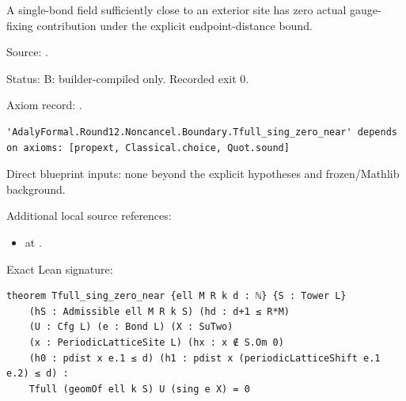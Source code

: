 \begin{theorem}[bp-204]
\label{bp-204}
\uses{}
\leanok
A single-bond field sufficiently close to an exterior site has zero actual gauge-fixing contribution under the explicit endpoint-distance bound.

\par Source: \texttt{}.
\par Status: B: builder-compiled only. Recorded exit 0.
\par Axiom record: \texttt{}.
\begin{verbatim}
'AdalyFormal.Round12.Noncancel.Boundary.Tfull_sing_zero_near' depends on axioms: [propext, Classical.choice, Quot.sound]
\end{verbatim}
\par Direct blueprint inputs: none beyond the explicit hypotheses and frozen/Mathlib background.
\par Additional local source references:
\begin{itemize}
\item \texttt{} at \texttt{}.
\end{itemize}
\par Exact Lean signature:
\begin{verbatim}
theorem Tfull_sing_zero_near {ell M R k d : ℕ} {S : Tower L}
    (hS : Admissible ell M R k S) (hd : d+1 ≤ R*M)
    (U : Cfg L) (e : Bond L) (X : SuTwo)
    (x : PeriodicLatticeSite L) (hx : x ∉ S.Om 0)
    (h0 : pdist x e.1 ≤ d) (h1 : pdist x (periodicLatticeShift e.1 e.2) ≤ d) :
    Tfull (geomOf ell k S) U (sing e X) = 0
\end{verbatim}
\end{theorem}


